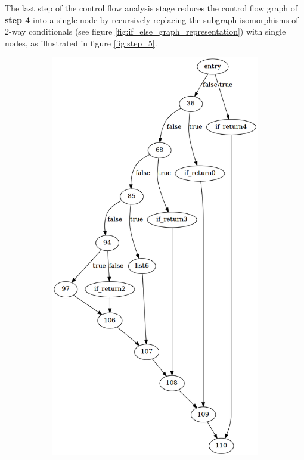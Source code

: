The last step of the control flow analysis stage reduces the control flow graph of \textbf{step 4} into a single node by recursively replacing the subgraph isomorphisms of 2-way conditionals (see figure \ref{fig:if_else_graph_representation}) with single nodes, as illustrated in figure \ref{fig:step_5}.

\begin{figure}[htbp]
	\centering
	\begin{subfigure}[t]{0.45\textwidth}
		\includegraphics[width=\textwidth]{appendices/stmt_example/stmt_4.png}

\end{subfigure}
\end{figure}
